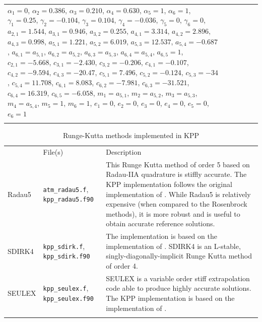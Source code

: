 \documentclass[twoside]{article}
\newcommand{\hhline}{\noalign{\vspace{1mm}}\hline\noalign{\vspace{1mm}}}
\begin{document}
\begin{table}
\begin{center}
\begin{tabular}{lcccp{1.5cm}p{9.5cm}}
  $\alpha_1 = 0$,
  $\alpha_2 = 0.386$,
  $\alpha_3 = 0.210$,
  $\alpha_4 = 0.630$,
  $\alpha_5 = 1$,
  $\alpha_6 = 1$,
  $\gamma_1 = 0.25$,
  $\gamma_2 = -0.104$,
  $\gamma_3 = 0.104$,
  $\gamma_4 = -0.036$,
  $\gamma_5 = 0$,
  $\gamma_6 = 0$,
  $a_{2,1} = 1.544$,
  $a_{3,1} = 0.946$,
  $a_{3,2} = 0.255$,
  $a_{4,1} = 3.314$,
  $a_{4,2} = 2.896$,
  $a_{4,3} = 0.998$,
  $a_{5,1} = 1.221$,
  $a_{5,2} = 6.019$,
  $a_{5,3} = 12.537$,
  $a_{5,4} = -0.687$,
  $a_{6,1} = a_{5,1}$,
  $a_{6,2} = a_{5,2}$,
  $a_{6,3} = a_{5,3}$,
  $a_{6,4} = a_{5,4}$,
  $a_{6,5} = 1$,
  $c_{2,1} = -5.668$,
  $c_{3,1} = -2.430$,
  $c_{3,2} = -0.206$,
  $c_{4,1} = -0.107$,
  $c_{4,2} = -9.594$,
  $c_{4,3} = -20.47$,
  $c_{5,1} = 7.496$,
  $c_{5,2} = -0.124$,
  $c_{5,3} = -34$,
  $c_{5,4} = 11.708$,
  $c_{6,1} = 8.083$,
  $c_{6,2} = -7.981$,
  $c_{6,3} = -31.521$,
  $c_{6,4} = 16.319$,
  $c_{6,5} = -6.058$,
  $m_1 = a_{5,1}$,
  $m_2 = a_{5,2}$,
  $m_3 = a_{5,3}$,
  $m_4 = a_{5,4}$,
  $m_5 = 1$,
  $m_6 = 1$,
  $e_1 = 0$,
  $e_2 = 0$,
  $e_3 = 0$,
  $e_4 = 0$,
  $e_5 = 0$,
  $e_6 = 1$\\
\hhline
\end{tabular}
\end{center}
\end{table}

\begin{table}
\begin{center}
\caption{Runge-Kutta methods implemented in KPP}
\label{tab:Runge-Kutta}
\begin{tabular}{lp{2.5cm}p{10cm}}
\hhline
\multicolumn{1}{c}{Method} & File(s) & Description\\
\hhline
Radau5 & {\tt atm\_radau5.f}, {\tt kpp\_radau5.f90} &
This Runge Kutta method of order 5 based on Radau-IIA quadrature
\citep{k:HW2} is stiffly accurate.  The KPP implementation follows the
original implementation of \citet{k:HW2}. While Radau5 is relatively
expensive (when compared to the Rosenbrock methods), it is more robust
and is useful to obtain accurate reference solutions.\\
SDIRK4 & {\tt kpp\_sdirk.f}, {\tt kpp\_sdirk.f90} &
The implementation is based on the implementation of \citet{k:HW2}.
SDIRK4 is an L-stable, singly-diagonally-implicit Runge Kutta method of
order 4.\\
SEULEX & {\tt kpp\_seulex.f}, {\tt kpp\_seulex.f90} &
SEULEX is a variable order stiff extrapolation code able to produce highly
accurate solutions. The KPP implementation is based on the implementation
of \citet{k:HW2}.\\
\hhline
\end{tabular}
\end{center}
\end{table}
\end{document}
